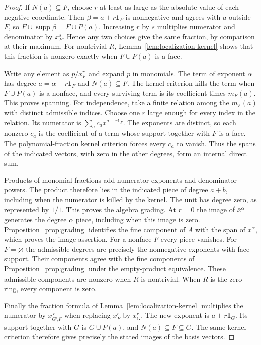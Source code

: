 \begin{proof}
\leanok
If $N(a)\subseteq F$, choose $r$ at least as large as the absolute value
of each negative coordinate. Then $\beta=a+r\mathbf1_F$ is nonnegative
and agrees with $a$ outside $F$, so
$F\cup\operatorname{supp}\beta=F\cup P(a)$. Increasing $r$ by $s$
multiplies numerator and denominator by $x_F^s$. Hence any two choices
give the same fraction, by comparison at their maximum.
For nontrivial $R$, Lemma~\ref{lem:localization-kernel} shows that this fraction is nonzero
exactly when $F\cup P(a)$ is a face.

Write any element as $\bar p/x_F^r$ and expand $p$ in monomials.
The term of exponent $\alpha$ has degree $a=\alpha-r\mathbf1_F$ and
$N(a)\subseteq F$. The kernel criterion kills the term when
$F\cup P(a)$ is a nonface, and every surviving term is its coefficient
times $m_F(a)$. This proves spanning. For independence, take a finite
relation among the $m_F(a)$ with distinct admissible indices.
Choose one $r$ large enough for every index in the relation. Its numerator
is $\sum_a c_a x^{a+r\mathbf1_F}$. The exponents are distinct, so each
nonzero $c_a$ is the coefficient of a term whose support together with $F$
is a face. The polynomial-fraction kernel criterion forces every $c_a$
to vanish. Thus the spans of the indicated vectors, with zero in the
other degrees, form an internal direct sum.

Products of monomial fractions add numerator exponents and denominator
powers. The product therefore lies in the indicated piece of degree
$a+b$, including when the numerator is killed by the kernel. The unit
has degree zero, as represented by $1/1$. This proves the algebra grading.
At $r=0$ the image of $\bar x^\alpha$ generates the degree $\alpha$
piece, including when this image is zero. Proposition~\ref{prop:grading}
identifies the fine component of $A$ with the span of $\bar x^\alpha$,
which proves the image assertion.
For a nonface $F$ every piece vanishes. For $F=\varnothing$ the admissible
degrees are precisely the nonnegative exponents with face support.
Their components agree with the fine components of
Proposition~\ref{prop:grading} under the empty-product equivalence.
These admissible components are nonzero when $R$ is nontrivial.
When $R$ is the zero ring, every component is zero.

Finally the fraction formula of Lemma~\ref{lem:localization-kernel}
multiplies the numerator by $x_{G\setminus F}^{\,r}$ when replacing
$x_F^r$ by $x_G^r$.
The new exponent is $a+r\mathbf1_G$. Its support together with $G$ is
$G\cup P(a)$, and $N(a)\subseteq F\subseteq G$. The same kernel criterion
therefore gives precisely the stated images of the basis vectors.
\end{proof}

